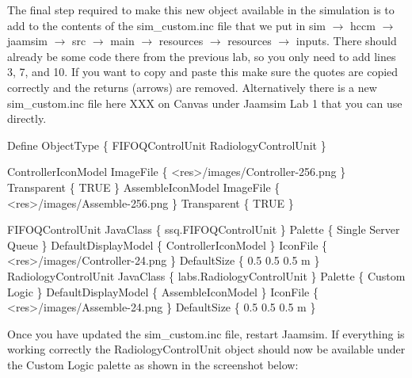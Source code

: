 \documentclass[
  10pt,
  a4paperpaper,
  DIV=11,
  numbers=noendperiod,
  oneside]{scrreprt}
\newenvironment{Shaded}{\begin{snugshade}}{\end{snugshade}}
\newcommand{\NormalTok}[1]{\textcolor[rgb]{0.00,0.23,0.31}{#1}}
\begin{document}
\newpage{}

The final step required to make this new object available in the
simulation is to add to the contents of the sim\_custom.inc file that we
put in sim \(\rightarrow\) hccm \(\rightarrow\) jaamsim \(\rightarrow\)
src \(\rightarrow\) main \(\rightarrow\) resources \(\rightarrow\)
resources \(\rightarrow\) inputs. There should already be some code
there from the previous lab, so you only need to add lines 3, 7, and 10.
If you want to copy and paste this make sure the quotes are copied
correctly and the returns (arrows) are removed. Alternatively there is a
new sim\_custom.inc file here XXX on Canvas under Jaamsim Lab 1 that you
can use directly.

\begin{Shaded}
\begin{Highlighting}[numbers=left,,]
\NormalTok{Define ObjectType \{}
\NormalTok{    FIFOQControlUnit}
\NormalTok{    RadiologyControlUnit}
\NormalTok{\}}

\NormalTok{ControllerIconModel ImageFile \{ \textquotesingle{}\textless{}res\textgreater{}/images/Controller{-}256.png\textquotesingle{} \}  Transparent \{ TRUE \}}
\NormalTok{AssembleIconModel ImageFile \{ \textquotesingle{}\textless{}res\textgreater{}/images/Assemble{-}256.png\textquotesingle{} \}  Transparent \{ TRUE \}}

\NormalTok{FIFOQControlUnit JavaClass \{ ssq.FIFOQControlUnit \}  Palette \{ \textquotesingle{}Single Server Queue\textquotesingle{} \} DefaultDisplayModel \{ ControllerIconModel \} IconFile \{ \textquotesingle{}\textless{}res\textgreater{}/images/Controller{-}24.png\textquotesingle{} \} DefaultSize \{ 0.5 0.5 0.5 m \}}
\NormalTok{RadiologyControlUnit JavaClass \{ labs.RadiologyControlUnit \}  Palette \{ \textquotesingle{}Custom Logic\textquotesingle{} \} DefaultDisplayModel \{ AssembleIconModel \} IconFile \{ \textquotesingle{}\textless{}res\textgreater{}/images/Assemble{-}24.png\textquotesingle{} \} DefaultSize \{ 0.5 0.5 0.5 m \}}
\end{Highlighting}
\end{Shaded}

Once you have updated the sim\_custom.inc file, restart Jaamsim. If
everything is working correctly the RadiologyControlUnit object should
now be available under the Custom Logic palette as shown in the
screenshot below:
\end{document}
